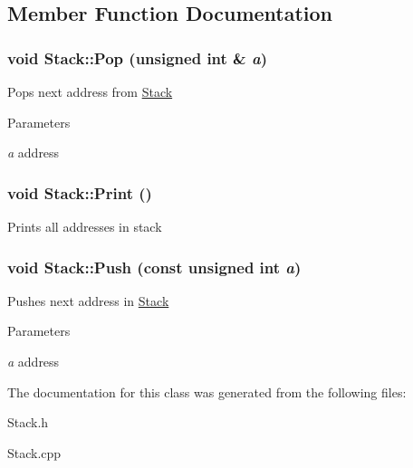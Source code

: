 \subsection{Member Function Documentation}
\hypertarget{classStack_a5f548c0c416082bba3c14e34752a3d0c}{
\subsubsection[{Pop}]{\setlength{\rightskip}{0pt plus 5cm}void Stack::Pop (unsigned int \& {\em a})}}
\label{classStack_a5f548c0c416082bba3c14e34752a3d0c}
Pops next address from \hyperlink{classStack}{Stack} 
\begin{DoxyParams}{Parameters}
\item[{\em a}]address \end{DoxyParams}
\hypertarget{classStack_a2f06e658c01857727857ee5499b2e465}{
\subsubsection[{Print}]{\setlength{\rightskip}{0pt plus 5cm}void Stack::Print ()}}
\label{classStack_a2f06e658c01857727857ee5499b2e465}
Prints all addresses in stack \hypertarget{classStack_af37f0135217037f2015513f984344e7b}{
\subsubsection[{Push}]{\setlength{\rightskip}{0pt plus 5cm}void Stack::Push (const unsigned int {\em a})}}
\label{classStack_af37f0135217037f2015513f984344e7b}
Pushes next address in \hyperlink{classStack}{Stack} 
\begin{DoxyParams}{Parameters}
\item[{\em a}]address \end{DoxyParams}


The documentation for this class was generated from the following files:\begin{DoxyCompactItemize}
\item 
Stack.h\item 
Stack.cpp\end{DoxyCompactItemize}
